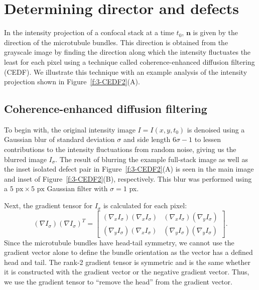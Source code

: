 \section{Determining director and defects}
In the intensity projection of a confocal stack at a time $t_0$, $\mathbf{n}$ is given by the direction of the microtubule bundles.
This direction is obtained from the grayscale image by finding the direction along which the intensity fluctuates the least for each pixel using a technique called coherence-enhanced diffusion filtering (CEDF)\cite{RN30}.
We illustrate this technique with an example analysis of the intensity projection shown in Figure~\ref{f:3-CEDF2}(A).


\subsection{Coherence-enhanced diffusion filtering}
To begin with, the original intensity image $I = I(x,y,t_0)$ is denoised using a Gaussian blur of standard deviation $\sigma$ and side length $6 \sigma -1$ to lessen contributions to the intensity fluctuations from random noise, giving us the blurred image $I_{\sigma}$.
The result of blurring the example full-stack image as well as the inset isolated defect pair in Figure~\ref{f:3-CEDF2}(A) is seen in the main image and inset of Figure~\ref{f:3-CEDF2}(B), respectively.
This blur was performed using a $5 \textrm{ px} \times 5 \textrm{ px}$ Gaussian filter with $\sigma= 1$ px.

Next, the gradient tensor for $I_{\sigma}$ is calculated for each pixel:
\begin{equation}
(\nabla I_{\sigma})(\nabla I_{\sigma})^T =
\begin{bmatrix}
(\nabla_x I_{\sigma})(\nabla_x I_{\sigma}) & (\nabla_x I_{\sigma})(\nabla_y I_{\sigma}) \\
(\nabla_y I_{\sigma})(\nabla_x I_{\sigma}) & (\nabla_y I_{\sigma})(\nabla_y I_{\sigma})
\end{bmatrix}.
\end{equation}
Since the microtubule bundles have head-tail symmetry, we cannot use the gradient vector alone to define the bundle orientation as the vector has a defined head and tail.
The rank-2 gradient tensor is symmetric and is the same whether it is constructed with the gradient vector or the negative gradient vector.
Thus, we use the gradient tensor to ``remove the head'' from the gradient vector.

